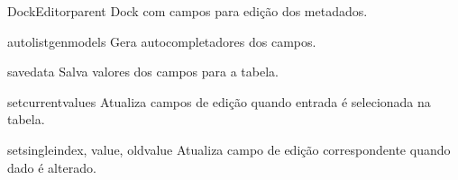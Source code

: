 \documentclass[letterpaper,10pt,portuguese]{manual}
\begin{document}
\hypertarget{veliger.DockEditor}{}\begin{classdesc}{DockEditor}{parent}
Dock com campos para edição dos metadados.

\hypertarget{veliger.DockEditor.autolistgen}{}\begin{methoddesc}{autolistgen}{models}
Gera autocompletadores dos campos.
\end{methoddesc}

\hypertarget{veliger.DockEditor.savedata}{}\begin{methoddesc}{savedata}{}
Salva valores dos campos para a tabela.
\end{methoddesc}

\hypertarget{veliger.DockEditor.setcurrent}{}\begin{methoddesc}{setcurrent}{values}
Atualiza campos de edição quando entrada é selecionada na tabela.
\end{methoddesc}

\hypertarget{veliger.DockEditor.setsingle}{}\begin{methoddesc}{setsingle}{index, value, oldvalue}
Atualiza campo de edição correspondente quando dado é alterado.
\end{methoddesc}
\end{classdesc}
\end{document}
